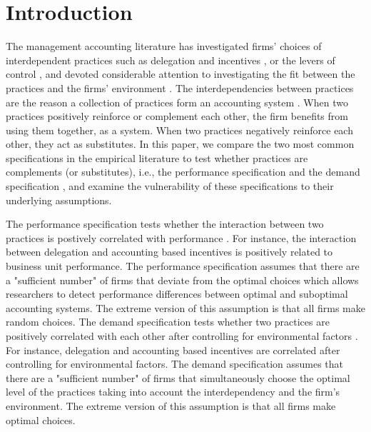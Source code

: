 \documentclass[12pt]{article}
\begin{document}
\newpage


\section{Introduction}\label{introduction}

The management accounting literature has investigated firms' choices of interdependent practices such as delegation and incentives \citep{bouwens_assessing_2007, indjejikian_accounting_2012, moers_performance_2006}, or the levers of control \citep{simons_levers_1994, simons_performance_2000, widener_empirical_2007}, and devoted considerable attention to investigating the fit between the practices and the firms' environment \citep{chenhall_management_2003, otley_contingency_2016}. The interdependencies between practices are the reason a collection of practices form an accounting system  \citep{grabner_management_2013,milgrom_complementarities_1995}. When two practices positively reinforce or complement each other, the firm benefits from using them together, as a system. When two practices negatively reinforce each other, they act as substitutes. In this paper, we compare the two most common specifications in the empirical literature to test whether practices are complements (or substitutes), i.e., the performance specification and the demand specification \citep{grabner_management_2013}, and examine the vulnerability of these specifications to their underlying assumptions. 

The performance specification tests whether the interaction between two practices is postively correlated with performance \citep{athey_empirical_1998, carree_note_2011, grabner_management_2013, hofmann_organizational_2017}. For instance, the interaction between delegation and accounting based incentives is positively related to business unit performance. The performance specification assumes that there are a "sufficient number" of firms that deviate from the optimal choices which allows researchers to detect performance differences between optimal and suboptimal accounting systems. The extreme version of this assumption is that all firms make random choices. The demand specification tests whether two practices are positively correlated with each other after controlling for environmental factors \citep{arora_testing_1996, grabner_management_2013, johansson_testing_2018, hofmann_organizational_2017}.  For instance, delegation and accounting based incentives are correlated after controlling for environmental factors. The demand specification assumes that there are a "sufficient number" of firms that simultaneously choose the optimal level of the practices taking into account the interdependency and the firm's environment. The extreme version of this assumption is that all firms make optimal choices.
\end{document}
